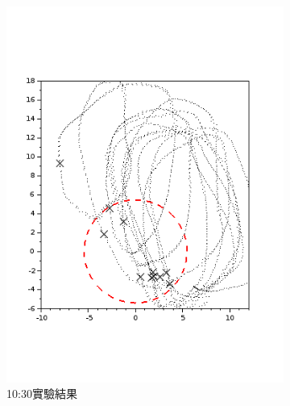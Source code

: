 \begin{figure}[h!]
	\centering
	\begin{subfigure}[t]{0.32\textwidth}
		\includegraphics[width=\textwidth]{figures/appendix1/dynamic_7}
		\caption{10:30實驗結果}
		\label{f:app:dynamic_7}
	\end{subfigure}
	\begin{subfigure}[t]{0.32\textwidth}

\end{subfigure}
\end{figure}

